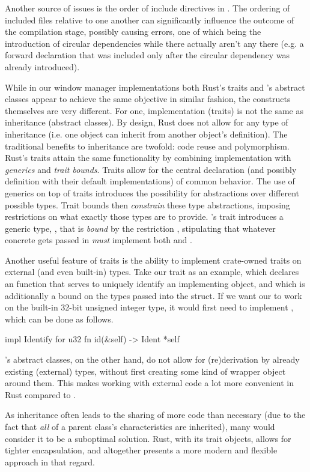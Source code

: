 Another source of issues is the order of include directives in \cpp. The
ordering of included files relative to one another can significantly influence
the outcome of the compilation stage, possibly causing errors, one of which
being the introduction of circular dependencies while there actually aren't any
there (e.g. a forward declaration that was included only after the circular
dependency was already introduced).

While in our window manager implementations both Rust's traits and \cpp's
abstract classes appear to achieve the same objective in similar fashion, the
constructs themselves are very different. For one, implementation (traits)
is not the same as inheritance (abstract classes). By design, Rust does not
allow for any type of inheritance (i.e. one object can inherit from another
object's definition). The traditional benefits to inheritance are twofold:
code reuse and polymorphism. Rust's traits attain the same functionality
by combining implementation with \textit{generics} and \textit{trait
bounds}\cite{therustbook, rustblogtraits}. Traits allow for the central
declaration (and possibly definition with their default implementations) of
common behavior\cite{therustbook, rustblogtraits}. The use of generics on top
of traits introduces the possibility for abstractions over different possible
types\cite{therustbook, rustblogtraits}. Trait bounds then \textit{constrain}
these type abstractions, imposing restrictions on what exactly those types
are to provide\cite{therustbook, rustblogtraits, therustreference}. \wmrs's
 trait introduces a generic type, , that is \textit{bound}
by the restriction , stipulating that whatever concrete
 gets passed in \textit{must} implement both  and
.

Another useful feature of traits is the ability to implement crate-owned
traits on external (and even built-in) types. Take our  trait
as an example, which declares an  function that serves to uniquely
identify an implementing object, and which is additionally a bound on the types
passed into the  struct. If we want our  to work on
the built-in 32-bit unsigned integer type, it would first need to implement
, which can be done as follows.

\begin{rustblock}
  impl Identify for u32 {
    fn id(&self) -> Ident {
      *self
    }
  }
\end{rustblock}

\cpp's abstract classes, on the other hand, do not allow for (re)derivation by
already existing (external) types, without first creating some kind of wrapper
object around them. This makes working with external code a lot more convenient
in Rust compared to \cpp.

As inheritance often leads to the sharing of more code than necessary (due to
the fact that \textit{all} of a parent class's characteristics are inherited),
many would consider it to be a suboptimal solution. Rust, with its trait
objects, allows for tighter encapsulation, and altogether presents a more modern
and flexible approach in that regard.
